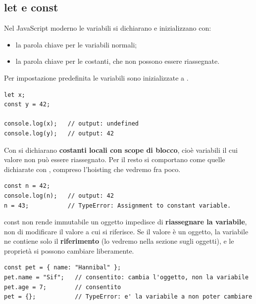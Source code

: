 \subsection{let e const}

Nel JavaScript moderno le variabili si dichiarano e inizializzano con:

\begin{itemize}
  \item la parola chiave  per le variabili \guillemotleft normali\guillemotright;
  \item la parola chiave  per le costanti, che non possono essere
        riassegnate.
\end{itemize}

Per impostazione predefinita le variabili sono inizializzate a
.

\begin{lstlisting}[style=js, name=variabili.js]
let x;
const y = 42;

console.log(x);   // output: undefined
console.log(y);   // output: 42
\end{lstlisting}

Con  si dichiarano \textbf{costanti locali con scope di blocco},
cioè variabili il cui valore non può essere riassegnato. Per il resto si
comportano come quelle dichiarate con , compreso l'hoisting che
vedremo fra poco.

\begin{lstlisting}[style=js, name=const.js]
const n = 42;
console.log(n);   // output: 42
n = 43;           // TypeError: Assignment to constant variable.
\end{lstlisting}

\begin{warningbox}{{const non rende immutabile un oggetto}}
   impedisce di \textbf{riassegnare la variabile}, non di
  modificare il valore a cui si riferisce. Se il valore è un oggetto, la
  variabile ne contiene solo il \textbf{riferimento} (lo vedremo nella sezione
  sugli oggetti), e le proprietà si possono cambiare liberamente.

\begin{lstlisting}[style=js]
const pet = { name: "Hannibal" };
pet.name = "Sif";   // consentito: cambia l'oggetto, non la variabile
pet.age = 7;        // consentito
pet = {};           // TypeError: e' la variabile a non poter cambiare
\end{lstlisting}
\end{warningbox}


